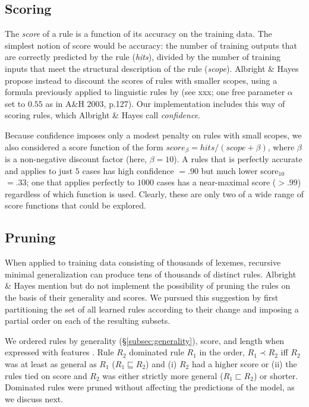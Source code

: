 \documentclass[11pt]{article}
\begin{document}
\subsection{Scoring}

The \emph{score} of a rule is a function of its accuracy on the training data. The simplest notion of score would be accuracy: the number of training outputs that are correctly predicted by the rule (\emph{hits}), divided by the number of training inputs that meet the structural description of the rule (\emph{scope}). Albright \& Hayes propose instead to discount the scores of rules with smaller scopes, using a formula previously applied to linguistic rules by \citet{mikheev-1997-automatic} (see xxx; one free parameter $\alpha$ set to $0.55$ as in A\&H 2003, p.127). Our implementation includes this way of scoring rules, which Albright \& Hayes call \textit{confidence}.

Because confidence imposes only a modest penalty on rules with small scopes, we also considered a score function of the form $score_{\beta} = hits / (scope + \beta)$, where $\beta$ is a non-negative discount factor (here, $\beta = 10$). A rules that is perfectly accurate and applies to just $5$ cases has high confidence $= .90$ but much lower score$_{10}$ $= .33$; one that applies perfectly to $1000$ cases has a near-maximal score ($> .99$) regardless of which function is used. Clearly, these are only two of a wide range of score functions that could be explored.

\subsection{Pruning}
\label{subsec:pruning}

When applied to training data consisting of thousands of lexemes, recursive minimal generalization can produce tens of thousands of distinct rules. Albright \& Hayes mention but do not implement the possibility of pruning the rules on the basis of their generality and scores. We pursued this suggestion by first partitioning the set of all learned rules according to their change and imposing a partial order on each of the resulting subsets.

We ordered rules by generality (\S\ref{subsec:generality}), score, and length when expressed with features \citep{chomsky1968a}. Rule $R_2$ dominated rule $R_1$ in the order, $R_1 \prec R_2$ iff $R_2$ was at least as general as $R_1$ ($R_1 \sqsubseteq R_2$) and (i) $R_2$ had a higher score or (ii) the rules tied on score and $R_2$ was either strictly more general ($R_1 \sqsubset R_2$) or shorter. Dominated rules were pruned without affecting the predictions of the model, as we discuss next.
\end{document}
